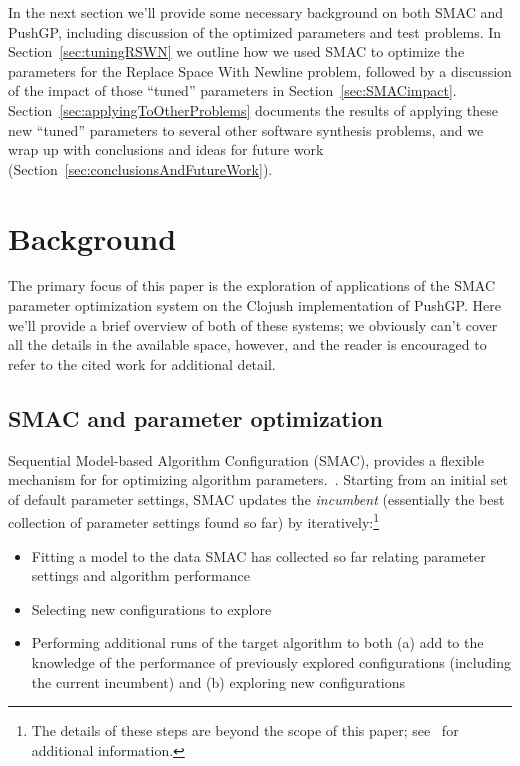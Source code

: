 In the next section we'll provide some necessary background on both SMAC
and PushGP, including discussion of the optimized parameters and test
problems. In Section~\ref{sec:tuningRSWN} we outline how we 
used SMAC to optimize the parameters for the Replace Space With Newline
problem, followed by a discussion of the impact of those ``tuned''
parameters in Section~\ref{sec:SMACimpact}. 
Section~\ref{sec:applyingToOtherProblems} documents the results of
applying these new ``tuned'' parameters to several other software
synthesis problems, and we wrap up with conclusions and ideas for future 
work (Section~\ref{sec:conclusionsAndFutureWork}).

\section{Background}
\label{sec:background}

The primary focus of this paper is the exploration of applications of the SMAC
parameter optimization system on the Clojush implementation of
PushGP. Here we'll provide a brief overview of both of these systems; we
obviously can't cover all the details in the available space, however, and the
reader is encouraged to refer to the cited work for additional detail.

\subsection{SMAC and parameter optimization}
\label{sec:SMACbackground}

Sequential Model-based Algorithm Configuration (SMAC),
provides a flexible mechanism for for optimizing algorithm 
parameters.~\cite{HutHooLey11-SMAC}. Starting from an initial set of default
parameter settings, SMAC updates the \emph{incumbent} (essentially the
best collection of parameter settings found so far) by 
iteratively:\footnote{The details of these steps are beyond the scope of this 
	paper; see~\cite{HutHooLey11-SMAC} for additional information.}
\begin{itemize}
	\item Fitting a model to the data SMAC has collected so far relating 
	parameter settings and algorithm performance
	\item Selecting new configurations to explore
	\item Performing additional runs of the target algorithm to both (a)
	add to the knowledge of the performance of previously explored
	configurations (including the current incumbent) and
	(b) exploring new configurations
\end{itemize}

